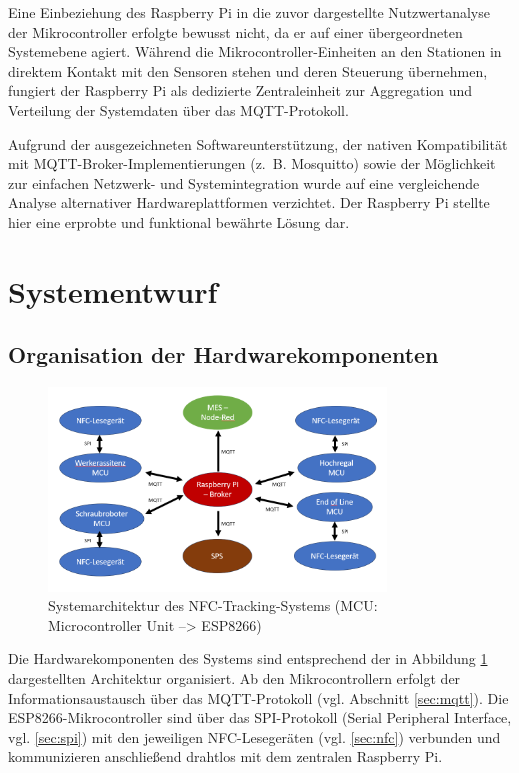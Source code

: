 Eine Einbeziehung des Raspberry Pi in die zuvor dargestellte Nutzwertanalyse der Mikrocontroller erfolgte bewusst nicht, da er auf einer übergeordneten Systemebene agiert. Während die Mikrocontroller-Einheiten an den Stationen in direktem Kontakt mit den Sensoren stehen und deren Steuerung übernehmen, fungiert der Raspberry Pi als dedizierte Zentraleinheit zur Aggregation und Verteilung der Systemdaten über das MQTT-Protokoll.

Aufgrund der ausgezeichneten Softwareunterstützung, der nativen Kompatibilität mit MQTT-Broker-Implementierungen (z.~B. Mosquitto) sowie der Möglichkeit zur einfachen Netzwerk- und Systemintegration wurde auf eine vergleichende Analyse alternativer Hardwareplattformen verzichtet. Der Raspberry Pi stellte hier eine erprobte und funktional bewährte Lösung dar.



\section{Systementwurf}
\label{sec:systementwurf}

\subsection{Organisation der Hardwarekomponenten}
\begin{figure}[H] %
	\centering
	\includegraphics[width=0.8\textwidth]{images/Systemarchitektur.png}
	\caption{Systemarchitektur des NFC-Tracking-Systems (MCU: Microcontroller Unit --> ESP8266)}
	\label{fig:systemarchitektur}
\end{figure}


Die Hardwarekomponenten des Systems sind entsprechend der in Abbildung \ref{fig:systemarchitektur} dargestellten Architektur organisiert. Ab den Mikrocontrollern erfolgt der Informationsaustausch über das MQTT-Protokoll (vgl. Abschnitt \autoref{sec:mqtt}). Die ESP8266-Mikrocontroller sind über das SPI-Protokoll (Serial Peripheral Interface, vgl. \autoref{sec:spi}) mit den jeweiligen NFC-Lesegeräten (vgl. \autoref{sec:nfc}) verbunden und kommunizieren anschließend drahtlos mit dem zentralen Raspberry Pi.

